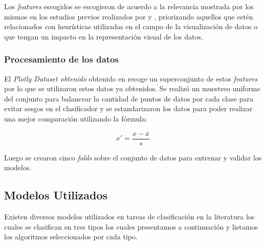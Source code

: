 \documentclass[a4paper,10pt,twocolumn]{article}
\begin{document}
			Los \textit{features} escogidos se escogieron de acuerdo a la relevancia mostrada por los mismos en los estudios
			previos realizados por \cite{hu2019vizml} y \cite{li2021kg4vis}, priorizando aquellos que est\'en relacionados con 
			heur\'isticas utilizadas en el campo de la visualizaci\'on de datos o que tengan un impacto en la representaci\'on 
			visual de los datos.

			\subsubsection{Procesamiento de los datos}

			El \textit{Plotly Dataset obtenido} obtenido en \cite{li2021kg4vis} recoge un
			superconjunto de estos \textit{features} por lo que se utilizaron estos datos ya
			obtenidos.
			Se realiz\'o un muestreo uniforme del conjunto para balancear la cantidad de puntos de datos
			por cada clase para evitar sesgos en el clasificador y se estandarizaron los datos
			para poder realizar una mejor comparaci\'on utilizando la f\'ormula:

			$$
				x' = \frac{x - \overline{x}}{s}
			$$
			
			Luego se crearon cinco \textit{folds} sobre el conjunto de datos para entrenar y 
			validar los modelos.
	
	

	\subsection{Modelos Utilizados}
	
	Existen diversos modelos utilizados en tareas de clasificaci\'on en la literatura
	los cuales se clasifican en tres tipos los cuales presentamos a continuaci\'on y listamos
	los algoritmos seleccionados por cada tipo.
\end{document}
